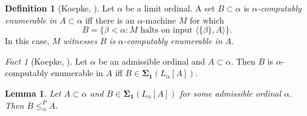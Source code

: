 \documentclass[12pt, twoside]{memoir}
\numberwithin{equation}{section}
\newtheorem{lem}[thm]{Lemma}
\theoremstyle{definition}
\newtheorem{defi}[thm]{Definition}
\theoremstyle{remark}
\newtheorem{fact}[thm]{Fact}
\theoremstyle{definition}
\theoremstyle{definition}
\theoremstyle{definition}
\theoremstyle{remark}
\begin{document}
\begin{defi}[Koepke, \cite{koepke2}]
Let $\alpha$ be a limit ordinal. A set $B \subset \alpha$ is $\alpha$\emph{-computably enumerable in} $A \subset \alpha$ iff there is an $\alpha$-machine $M$ for which
\begin{equation*}
    B = \{\beta < \alpha : M \text{ halts on input } \langle \{\beta\}, A \rangle\} \text{.}
\end{equation*}
In this case, $M$ \emph{witnesses} $B$ \emph{is} $\alpha$\emph{-computably enumerable in} $A$.
\end{defi}

\begin{fact}[Koepke, \cite{koepke2}]\label{fact272}
Let $\alpha$ be an admissible ordinal and $A \subset \alpha$. Then $B$ is $\alpha$-computably enumerable in $A$ iff $B \in \mathbf{\Sigma_1}(L_{\alpha}[A])$.
\end{fact}

\begin{lem}\label{lem273}
Let $A \subset \alpha$ and $B \in \mathbf{\Sigma_1}(L_{\alpha}[A])$ for some admissible ordinal $\alpha$. Then $B \leq^P_{\alpha} A$.
\end{lem}
\end{document}
